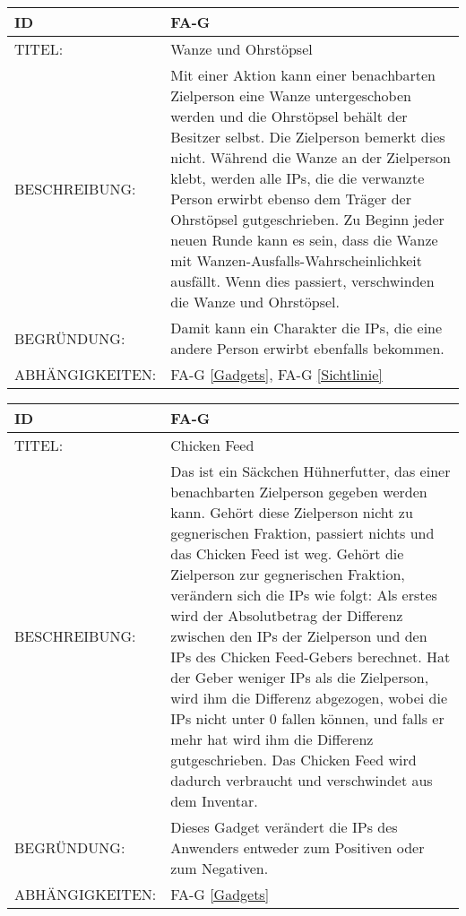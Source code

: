 \begin{tabularx}{16cm}{l|X}
	{table}\label{Wanze und Ohrstoepsel}
	\textbf{ID} & \textbf{FA-G \arabic{table}} \\
	\hline
	TITEL: & Wanze und Ohrstöpsel \\
	\hline
	BESCHREIBUNG: & Mit einer Aktion kann einer benachbarten Zielperson eine Wanze untergeschoben werden und die Ohrstöpsel behält der Besitzer selbst. Die Zielperson bemerkt dies nicht. Während die Wanze an der Zielperson klebt, werden alle IPs, die die verwanzte Person erwirbt ebenso dem Träger der Ohrstöpsel gutgeschrieben. Zu Beginn jeder neuen Runde kann es sein, dass die Wanze mit Wanzen-Ausfalls-Wahrscheinlichkeit ausfällt. Wenn dies passiert, verschwinden die Wanze und Ohrstöpsel. \\
	\hline
	BEGRÜNDUNG: &  Damit kann ein Charakter die IPs, die eine andere Person erwirbt ebenfalls bekommen. \\
	\hline
	ABHÄNGIGKEITEN: & FA-G \ref{Gadgets}, FA-G \ref{Sichtlinie} \\
\end{tabularx}

\begin{tabularx}{16cm}{l|X}
	{table}\label{Chicken Feed}
	\textbf{ID} & \textbf{FA-G \arabic{table}} \\
	\hline
	TITEL: & Chicken Feed \\
	\hline
	BESCHREIBUNG: & Das ist ein Säckchen Hühnerfutter, das einer benachbarten Zielperson gegeben werden kann. Gehört diese Zielperson nicht zu gegnerischen Fraktion, passiert nichts und das Chicken Feed ist weg. Gehört die Zielperson zur gegnerischen Fraktion, verändern sich die IPs wie folgt: Als erstes wird der Absolutbetrag der Differenz zwischen den IPs der Zielperson und den IPs des Chicken Feed-Gebers berechnet. Hat der Geber weniger IPs als die Zielperson, wird ihm die Differenz abgezogen, wobei die IPs nicht unter 0 fallen können, und falls er mehr hat wird ihm die Differenz gutgeschrieben. Das Chicken Feed wird dadurch verbraucht und verschwindet aus dem Inventar. \\
	\hline
	BEGRÜNDUNG: &  Dieses Gadget verändert die IPs des Anwenders entweder zum Positiven oder zum Negativen. \\
	\hline
	ABHÄNGIGKEITEN: & FA-G \ref{Gadgets} \\
\end{tabularx}


